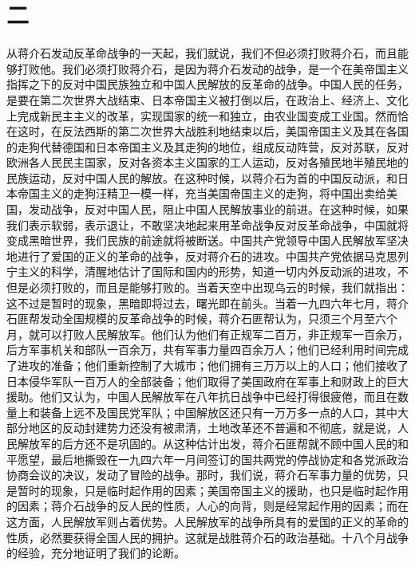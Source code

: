 \section*{二}

从蒋介石发动反革命战争的一天起，我们就说，我们不但必须打败蒋介石，而且能够打败他。我们必须打败蒋介石，是因为蒋介石发动的战争，是一个在美帝国主义指挥之下的反对中国民族独立和中国人民解放的反革命的战争。中国人民的任务，是要在第二次世界大战结束、日本帝国主义被打倒以后，在政治上、经济上、文化上完成新民主主义的改革，实现国家的统一和独立，由农业国变成工业国。然而恰在这时，在反法西斯的第二次世界大战胜利地结束以后，美国帝国主义及其在各国的走狗代替德国和日本帝国主义及其走狗的地位，组成反动阵营，反对苏联，反对欧洲各人民民主国家，反对各资本主义国家的工人运动，反对各殖民地半殖民地的民族运动，反对中国人民的解放。在这种时候，以蒋介石为首的中国反动派，和日本帝国主义的走狗汪精卫一模一样，充当美国帝国主义的走狗，将中国出卖给美国，发动战争，反对中国人民，阻止中国人民解放事业的前进。在这种时候，如果我们表示软弱，表示退让，不敢坚决地起来用革命战争反对反革命战争，中国就将变成黑暗世界，我们民族的前途就将被断送。中国共产党领导中国人民解放军坚决地进行了爱国的正义的革命的战争，反对蒋介石的进攻。中国共产党依据马克思列宁主义的科学，清醒地估计了国际和国内的形势，知道一切内外反动派的进攻，不但是必须打败的，而且是能够打败的。当着天空中出现乌云的时候，我们就指出：这不过是暂时的现象，黑暗即将过去，曙光即在前头。当着一九四六年七月，蒋介石匪帮发动全国规模的反革命战争的时候，蒋介石匪帮认为，只须三个月至六个月，就可以打败人民解放军。他们认为他们有正规军二百万，非正规军一百余万，后方军事机关和部队一百余万，共有军事力量四百余万人；他们已经利用时间完成了进攻的准备；他们重新控制了大城市；他们拥有三万万以上的人口；他们接收了日本侵华军队一百万人的全部装备；他们取得了美国政府在军事上和财政上的巨大援助。他们又认为，中国人民解放军在八年抗日战争中已经打得很疲倦，而且在数量上和装备上远不及国民党军队；中国解放区还只有一万万多一点的人口，其中大部分地区的反动封建势力还没有被肃清，土地改革还不普遍和不彻底，就是说，人民解放军的后方还不是巩固的。从这种估计出发，蒋介石匪帮就不顾中国人民的和平愿望，最后地撕毁在一九四六年一月间签订的国共两党的停战协定和各党派政治协商会议的决议，发动了冒险的战争。那时，我们说，蒋介石军事力量的优势，只是暂时的现象，只是临时起作用的因素；美国帝国主义的援助，也只是临时起作用的因素；蒋介石战争的反人民的性质，人心的向背，则是经常起作用的因素；而在这方面，人民解放军则占着优势。人民解放军的战争所具有的爱国的正义的革命的性质，必然要获得全国人民的拥护。这就是战胜蒋介石的政治基础。十八个月战争的经验，充分地证明了我们的论断。

